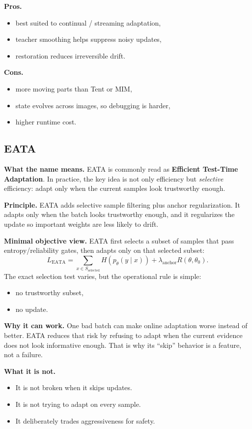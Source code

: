 \textbf{Pros.}
\begin{itemize}
  \item best suited to continual / streaming adaptation,
  \item teacher smoothing helps suppress noisy updates,
  \item restoration reduces irreversible drift.
\end{itemize}

\textbf{Cons.}
\begin{itemize}
  \item more moving parts than Tent or MIM,
  \item state evolves across images, so debugging is harder,
  \item higher runtime cost.
\end{itemize}

\subsection{EATA}
\textbf{What the name means.}
EATA is commonly read as \textbf{Efficient Test-Time Adaptation}.
In practice, the key idea is not only efficiency but \emph{selective} efficiency:
adapt only when the current samples look trustworthy enough.

\textbf{Principle.}
EATA adds selective sample filtering plus anchor regularization. It adapts only when the batch looks trustworthy enough, and it regularizes the update so important weights are less likely to drift.

\textbf{Minimal objective view.}
EATA first selects a subset of samples that pass entropy/reliability gates, then adapts only on that selected subset:
\[
L_{\mathrm{EATA}} = \sum_{x \in S_{\mathrm{selected}}} H\!\left(p_{\theta}(y \mid x)\right) + \lambda_{\mathrm{anchor}} R(\theta, \theta_0).
\]
The exact selection test varies, but the operational rule is simple:
\begin{itemize}
  \item no trustworthy subset,
  \item no update.
\end{itemize}

\textbf{Why it can work.}
One bad batch can make online adaptation worse instead of better.
EATA reduces that risk by refusing to adapt when the current evidence does not look informative enough.
That is why its ``skip'' behavior is a feature, not a failure.

\textbf{What it is not.}
\begin{itemize}
  \item It is not broken when it skips updates.
  \item It is not trying to adapt on every sample.
  \item It deliberately trades aggressiveness for safety.
\end{itemize}

